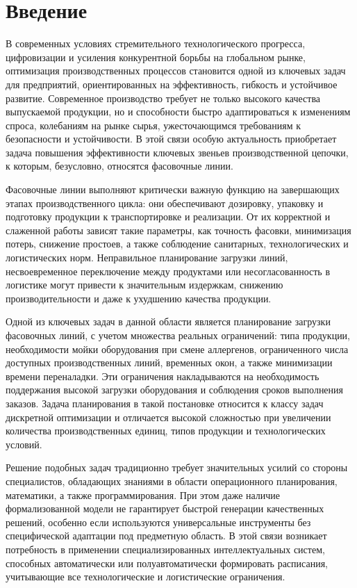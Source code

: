 \chapter*{Введение}

В современных условиях стремительного технологического прогресса, цифровизации и усиления конкурентной борьбы на глобальном рынке, оптимизация производственных процессов становится одной из ключевых задач для предприятий, ориентированных на эффективность, гибкость и устойчивое развитие. Современное производство требует не только высокого качества выпускаемой продукции, но и способности быстро адаптироваться к изменениям спроса, колебаниям на рынке сырья, ужесточающимся требованиям к безопасности и устойчивости. В этой связи особую актуальность приобретает задача повышения эффективности ключевых звеньев производственной цепочки, к которым, безусловно, относятся фасовочные линии.

Фасовочные линии выполняют критически важную функцию на завершающих этапах производственного цикла: они обеспечивают дозировку, упаковку и подготовку продукции к транспортировке и реализации. От их корректной и слаженной работы зависят такие параметры, как точность фасовки, минимизация потерь, снижение простоев, а также соблюдение санитарных, технологических и логистических норм. Неправильное планирование загрузки линий, несвоевременное переключение между продуктами или несогласованность в логистике могут привести к значительным издержкам, снижению производительности и даже к ухудшению качества продукции.

Одной из ключевых задач в данной области является планирование загрузки фасовочных линий, с учетом множества реальных ограничений: типа продукции, необходимости мойки оборудования при смене аллергенов, ограниченного числа доступных производственных линий, временных окон, а также минимизации времени переналадки. Эти ограничения накладываются на необходимость поддержания высокой загрузки оборудования и соблюдения сроков выполнения заказов. Задача планирования в такой постановке относится к классу задач дискретной оптимизации и отличается высокой сложностью при увеличении количества производственных единиц, типов продукции и технологических условий.

Решение подобных задач традиционно требует значительных усилий со стороны специалистов, обладающих знаниями в области операционного планирования, математики, а также программирования. При этом даже наличие формализованной модели не гарантирует быстрой генерации качественных решений, особенно если используются универсальные инструменты без специфической адаптации под предметную область. В этой связи возникает потребность в применении специализированных интеллектуальных систем, способных автоматически или полуавтоматически формировать расписания, учитывающие все технологические и логистические ограничения.

